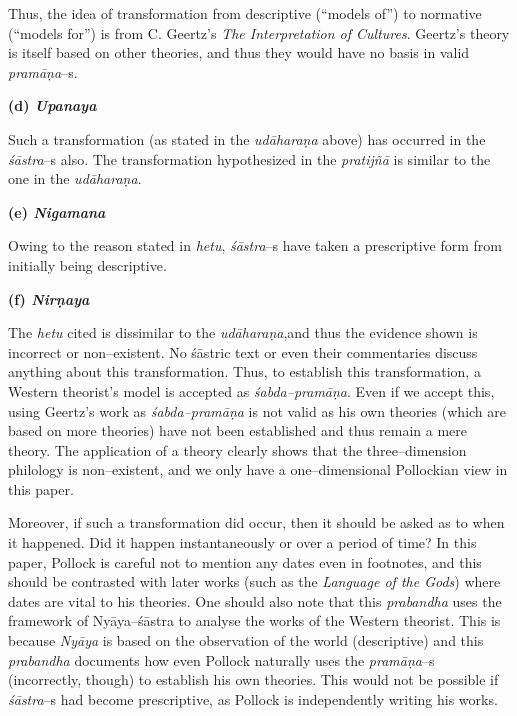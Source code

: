 Thus, the idea of transformation from descriptive (“models of”) to normative (“models for”) is from C. Geertz’s \textit{The Interpretation of Cultures}. Geertz’s theory is itself based on other theories, and thus they would have no basis in valid\textit{ pramāṇa}–s.

\textbf{(d) \textit{Upanaya}}

Such a transformation (as stated in the \textit{udāharaṇa} above) has occurred in the \textit{śāstra}–s also. The transformation hypothesized in the \textit{pratijñā} is similar to the one in the\textit{ udāharaṇa}.


\textbf{(e) \textit{Nigamana}}

Owing to the reason stated in \textit{hetu}, \textit{śāstra}–s have taken a prescriptive form from initially being descriptive.

\textbf{(f) \textit{Nirṇaya}}

The \textit{hetu} cited is dissimilar to the \textit{udāharaṇa},and thus the evidence shown is incorrect or non–existent. No śāstric text or even their commentaries discuss anything about this transformation. Thus, to establish this transformation, a Western theorist’s model is accepted as \textit{śabda–pramāṇa}. Even if we accept this, using Geertz’s work as \textit{śabda–pramāṇa} is not valid as his own theories (which are based on more theories) have not been established and thus remain a mere theory. The application of a theory clearly shows that the three–dimension philology is non–existent, and we only have a one–dimensional Pollockian view in this paper.

Moreover, if such a transformation did occur, then it should be asked as to when it happened. Did it happen instantaneously or over a period of time? In this paper, Pollock is careful not to mention any dates even in footnotes, and this should be contrasted with later works (such as the \textit{Language of the Gods}) where dates are vital to his theories. One should also note that this \textit{prabandha} uses the framework of Nyāya–śāstra to analyse the works of the Western theorist. This is because \textit{Nyāya }is based on the observation of the world (descriptive) and this \textit{prabandha} documents how even Pollock naturally uses the \textit{pramāṇa}–s (incorrectly, though) to establish his own theories. This would not be possible if \textit{śāstra}–s had become prescriptive, as Pollock is independently writing his works.

